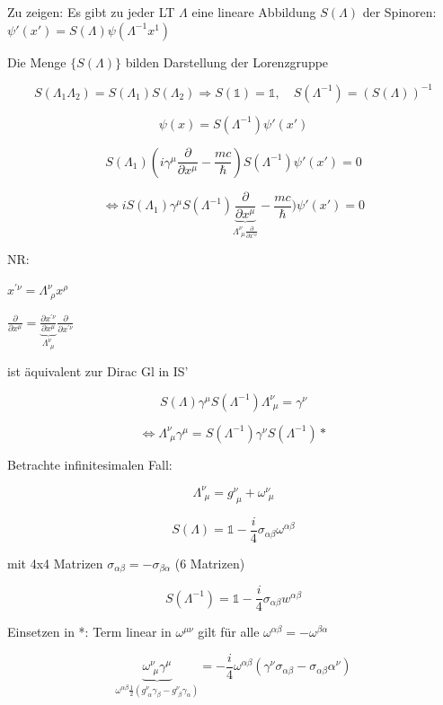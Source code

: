 Zu zeigen: Es gibt zu jeder LT \(\Lambda\) eine lineare Abbildung \(S(\Lambda)\) der Spinoren: \(\psi'(x')=S(\Lambda)\psi(\Lambda^{-1}x^1)\)

Die Menge \(\{S(\Lambda)\}\) bilden Darstellung der Lorenzgruppe

\[S(\Lambda_1\Lambda_2) = S(\Lambda_1)S(\Lambda_2) \Rightarrow S(\mathbb 1) = \mathbb 1, \quad S(\Lambda^{-1})=(S(\Lambda))^{-1}\]

\[\psi(x) = S(\Lambda^{-1})\psi'(x') \]



\[S(\Lambda_1)  (i\gamma^\mu\frac{\partial}{\partial x^\mu}-\frac{mc}{\hbar})S(\Lambda^{-1}) \psi'(x') = 0\]

\[\Leftrightarrow iS(\Lambda_1) \gamma^\mu S(\Lambda^{-1})\underbrace{\frac{\partial}{\partial x^\mu}}_{\Lambda^\nu_{\,\,\mu}\frac{\partial}{\partial x^{'\nu}}} - \frac{mc}{\hbar})\psi'(x') = 0 \]

NR:

\(x^{'\nu}=\Lambda^\nu_{\,\,\rho}x^\rho \)

\(\frac{\partial}{\partial x^\mu} =\underbrace{\frac{\partial x^{'\nu}}{\partial x^{\mu}}}_{\Lambda^\nu_{\,\,\mu}}\frac{\partial}{\partial x^{'\nu}} \)

ist äquivalent zur Dirac Gl in IS'

\[S(\Lambda)\gamma^\mu S(\Lambda^{-1})\Lambda^\nu_{\,\,\mu} = \gamma^\nu\]

\[\Leftrightarrow \boxed{ \Lambda^\nu_{\,\,\mu}\gamma^\mu = S(\Lambda^{-1})\gamma^\nu S(\Lambda^{-1})  }* \]

Betrachte infinitesimalen Fall:

\[ \Lambda^\nu_{\,\,\mu} = g^\nu_{\,\,\mu}+\omega^\nu_{\,\,\mu}  \]

\[S(\Lambda) = \mathbb 1 - \frac{i}{4} \sigma_{\alpha\beta}\omega^{\alpha\beta}\]

mit 4x4 Matrizen \(\sigma_{\alpha\beta} = - \sigma_{\beta\alpha} \) (6 Matrizen)

\[ S(\Lambda^{-1}) = \mathbb 1 - \frac{i}{4} \sigma_{\alpha\beta}w^{\alpha\beta}  \]

Einsetzen in *: Term linear in \( \omega^{\mu\nu}  \) gilt für alle \(\omega^{\alpha\beta} = -\omega^{\beta\alpha}\)

\[\underbrace{\omega^\nu_{\,\,\mu}\gamma^{\mu}}_{\omega^{\alpha\beta}\frac{1}{2}(g^{\nu}_{\,\,\alpha}\gamma_\beta -g^{\nu}_{\,\,\beta}\gamma_\alpha) } = -  \frac{i}{4}\omega^{\alpha\beta}(\gamma^\nu\sigma_{\alpha\beta}-\sigma_{\alpha\beta}\alpha^\nu) \]


